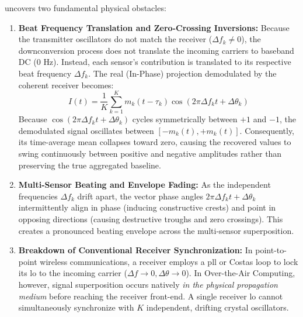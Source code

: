 \documentclass[Markos_Delaportas_1316.tex]{subfiles}
\begin{document}
 uncovers two fundamental
physical obstacles:
\begin{enumerate}[leftmargin=*]
    \item \textbf{Beat Frequency Translation and Zero-Crossing Inversions:}
        Because the transmitter oscillators do not match the receiver
        ($\Delta f_k \neq 0$),
        the downconversion process does not translate the incoming
        carriers to baseband DC ($0\text{ Hz}$).
        Instead, each sensor's contribution is translated to its
        respective beat frequency $\Delta f_k$.
        The real (In-Phase) projection demodulated by the coherent
        receiver becomes:
        \begin{equation}
            I(t) = \frac{1}{K}\sum_{k=1}^K m_k(t - \tau_k) \cos(2\pi
            \Delta f_k t + \Delta \theta_k)
            \label{eq:async_inphase_beating}
        \end{equation}
        Because $\cos(2\pi \Delta f_k t + \Delta \theta_k)$ cycles
        symmetrically between $+1$ and $-1$,
        the demodulated signal oscillates between $[-m_k(t),
        +m_k(t)]$. Consequently, its time-average
        mean collapses toward zero, causing the recovered values to
        swing continuously between positive
        and negative amplitudes rather than preserving the true
        aggregated baseline.
    \item \textbf{Multi-Sensor Beating and Envelope Fading:}
        As the independent frequencies $\Delta f_k$ drift apart, the
        vector phase angles
        $2\pi \Delta f_k t + \Delta \theta_k$ intermittently align in
        phase (inducing constructive crests)
        and point in opposing directions (causing destructive troughs
        and zero crossings). This creates
        a pronounced beating envelope across the multi-sensor superposition.
    \item \textbf{Breakdown of Conventional Receiver Synchronization:}
        In point-to-point wireless communications, a receiver employs
        a \gls{pll} or Costas loop to lock
        its \gls{lo} to the incoming carrier ($\Delta f \to 0, \Delta
        \theta \to 0$). In Over-the-Air Computing,
        however, signal superposition occurs natively \emph{in the
        physical propagation medium} before reaching
        the receiver front-end. A single receiver \gls{lo} cannot
        simultaneously synchronize with $K$ independent,
        drifting crystal oscillators.
\end{enumerate}
\end{document}

